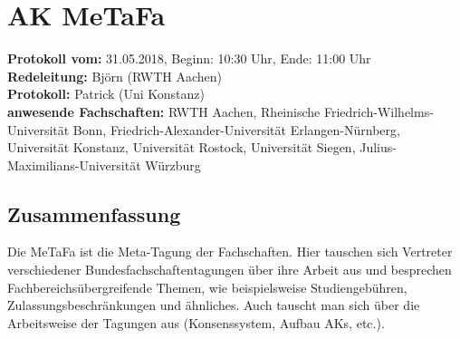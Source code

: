 \newpage

\section{AK MeTaFa}

	\textbf{Protokoll vom:} 31.05.2018,
	Beginn: 10:30 Uhr,
	Ende: 11:00 Uhr \\
	\textbf{Redeleitung:} Björn (RWTH Aachen) \\
	\textbf{Protokoll:} Patrick (Uni Konstanz) \\
	\textbf{anwesende Fachschaften:} RWTH Aachen, Rheinische Friedrich-Wilhelms-Universität Bonn, Friedrich-Alexander-Universität Erlangen-Nürnberg, Universität Konstanz, Universität Rostock, Universität Siegen, Julius-Maximilians-Universität Würzburg

	\subsection*{Zusammenfassung}
		Die MeTaFa ist die Meta-Tagung der Fachschaften. Hier tauschen sich Vertreter verschiedener Bundesfachschaftentagungen über ihre Arbeit aus und besprechen Fachbereichsübergreifende Themen, wie beispielsweise Studiengebühren, Zulassungsbeschränkungen und ähnliches. Auch tauscht man sich über die Arbeitsweise der Tagungen aus (Konsenssystem, Aufbau AKs, etc.).
